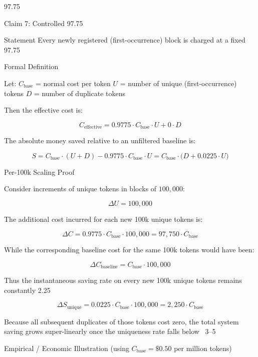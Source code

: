 97.75%

Claim 7: Controlled 97.75%

Statement  
Every newly registered (first-occurrence) block is charged at a fixed 97.75%

Formal Definition

Let:
\( C_{\text{base}} \) = normal cost per token
\( U \) = number of unique (first-occurrence) tokens
\( D \) = number of duplicate tokens

Then the effective cost is:

\[
C_{\text{effective}} = 0.9775 \cdot C_{\text{base}} \cdot U + 0 \cdot D
\]

The absolute money saved relative to an unfiltered baseline is:

\[
S = C_{\text{base}} \cdot (U + D) - 0.9775 \cdot C_{\text{base}} \cdot U = C_{\text{base}} \cdot \bigl( D + 0.0225 \cdot U \bigr)
\]

Per-100k Scaling Proof

Consider increments of unique tokens in blocks of \( 100{,}000 \):

\[
\Delta U = 100{,}000
\]

The additional cost incurred for each new 100k unique tokens is:

\[
\Delta C = 0.9775 \cdot C_{\text{base}} \cdot 100{,}000 = 97{,}750 \cdot C_{\text{base}}
\]

While the corresponding baseline cost for the same 100k tokens would have been:

\[
\Delta C_{\text{baseline}} = C_{\text{base}} \cdot 100{,}000
\]

Thus the instantaneous saving rate on every new 100k unique tokens remains constantly 2.25%

\[
\Delta S_{\text{unique}} = 0.0225 \cdot C_{\text{base}} \cdot 100{,}000 = 2{,}250 \cdot C_{\text{base}}
\]

Because all subsequent duplicates of those tokens cost zero, the total system saving grows super-linearly once the uniqueness rate falls below ~3–5%

Empirical / Economic Illustration (using \( C_{\text{base}} = \$0.50 \) per million tokens)

